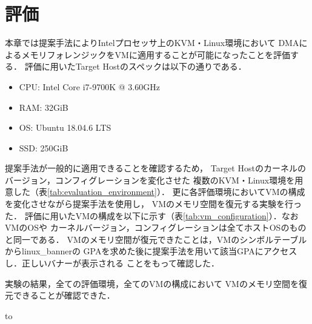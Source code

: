 \chapter{評価}
\label{chap:evaluation}

本章では提案手法によりIntelプロセッサ上のKVM・Linux環境において
DMAによるメモリフォレンジックをVMに適用することが可能になったことを評価する．
評価に用いたTarget Hostのスペックは以下の通りである．
\begin{itemize}
  \item CPU: Intel Core i7-9700K @ 3.60GHz
  \item RAM: 32GiB
  \item OS: Ubuntu 18.04.6 LTS
  \item SSD: 250GiB
\end{itemize}
提案手法が一般的に適用できることを確認するため，
Target Hostのカーネルのバージョン，コンフィグレーションを変化させた
複数のKVM・Linux環境を用意した（表\ref{tab:evaluation_environment}）．
更に各評価環境においてVMの構成を変化させながら提案手法を使用し，
VMのメモリ空間を復元する実験を行った．
評価に用いたVMの構成を以下に示す（表\ref{tab:vm_configuration}）．なおVMのOSや
カーネルバージョン，コンフィグレーションは全てホストOSのものと同一である．
VMのメモリ空間が復元できたことは，VMのシンボルテーブルからlinux\_bannerの
GPAを求めた後に提案手法を用いて該当GPAにアクセスし．正しいバナーが表示される
ことをもって確認した．

実験の結果，全ての評価環境，全てのVMの構成において
VMのメモリ空間を復元できることが確認できた．

\begin{table}[htbp]
\caption{評価環境の一覧}
\label{tab:evaluation_environment}
\hbox to
\end{table}



